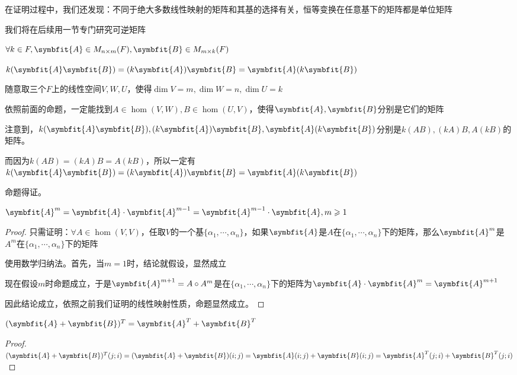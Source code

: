 \documentclass[12pt, a4paper, oneside, UTF8]{ctexbook}
\begin{document}
\begin{para}{0}
					在证明过程中，我们还发现：不同于绝大多数线性映射的矩阵和其基的选择有关，恒等变换在任意基下的矩阵都是单位矩阵

					我们将在后续用一节专门研究可逆矩阵
				\point{}
					\begin{proposition}
						$\forall k \in F,\symbfit{A} \in M_{n \times m}(F),\symbfit{B} \in M_{m \times k}(F)$

						$k(\symbfit{A}\symbfit{B})=(k\symbfit{A})\symbfit{B}=\symbfit{A}(k\symbfit{B})$
					\end{proposition}
					\begin{proposition}
						随意取三个$F$上的线性空间$V,W,U$，使得$\dim V = m,\dim W = n,\dim U = k$

						依照前面的命题，一定能找到$A \in \hom(V,W),B \in \hom(U,V)$，使得$\symbfit{A},\symbfit{B}$分别是它们的矩阵

						注意到，$k(\symbfit{A}\symbfit{B}),(k\symbfit{A})\symbfit{B},\symbfit{A}(k\symbfit{B})$分别是$k(AB),(kA)B,A(kB)$的矩阵。
						
						而因为$k(AB)=(kA)B=A(kB)$，所以一定有$k(\symbfit{A}\symbfit{B})=(k\symbfit{A})\symbfit{B}=\symbfit{A}(k\symbfit{B})$
						
						命题得证。
					\end{proposition}
				\point{}
					\begin{proposition}
						$\symbfit{A}^{m} = \symbfit{A} \cdot \symbfit{A}^{m-1} = \symbfit{A}^{m-1}\cdot \symbfit{A},m \geqslant 1$
					\end{proposition}
					\begin{proof}
						只需证明：$\forall A \in \hom(V,V)$，任取$V$的一个基$\{\alpha_1,\cdots,\alpha_n\}$，如果$\symbfit{A}$是$A$在$\{\alpha_1,\cdots,\alpha_n\}$下的矩阵，那么$\symbfit{A}^m$是$A^m$在$\{\alpha_1,\cdots,\alpha_n\}$下的矩阵

						使用数学归纳法。首先，当$m=1$时，结论就假设，显然成立

						现在假设$m$时命题成立，于是$\symbfit{A}^{m+1}=A \circ A^m$是在$\{\alpha_1,\cdots,\alpha_n\}$下的矩阵为$\symbfit{A}\cdot\symbfit{A}^m=\symbfit{A}^{m+1}$

						因此结论成立，依照之前我们证明的线性映射性质，命题显然成立。
					\end{proof}
				\point{}
					\begin{proposition}
						$(\symbfit{A}+\symbfit{B})^T = \symbfit{A}^T+\symbfit{B}^T$
					\end{proposition}
					\begin{proof}
						$(\symbfit{A}+\symbfit{B})^T (j;i) = (\symbfit{A}+\symbfit{B})(i;j) = \symbfit{A}(i;j)+\symbfit{B}(i;j)=\symbfit{A}^T(j;i)+\symbfit{B}^T(j;i)$


\end{proof}
\end{para}
\end{document}
